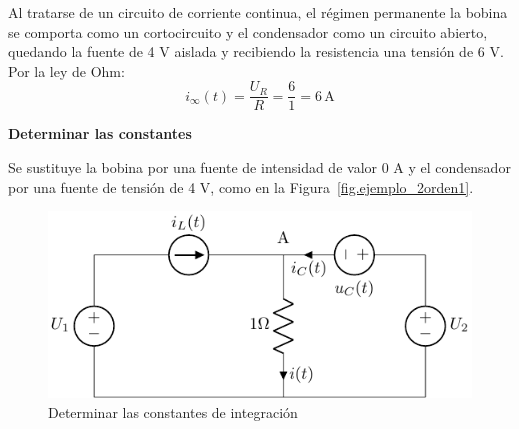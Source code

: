 \begin{example}
  Al tratarse de un circuito de corriente continua, el régimen
  permanente la bobina se comporta como un cortocircuito y el
  condensador como un circuito abierto, quedando la fuente de 4 V
  aislada y recibiendo la resistencia una tensión de 6 V. Por la ley
  de Ohm:
  \begin{equation*}
    i_\infty(t)=\dfrac{U_R}{R}=\dfrac{6}{1}=6\,\text{A}
  \end{equation*}
	    
  \textbf{Determinar las constantes}
	    
  Se sustituye la bobina por una fuente de intensidad de valor 0 A y
  el condensador por una fuente de tensión de 4 V, como en la
  Figura~\ref{fig.ejemplo_2orden1}.
  \begin{figure}[H]
    \centering
    \includegraphics[width=0.45\linewidth]{../figs/ejemplo_2orden2.pdf}
    \caption{Determinar las constantes de integración}
    \label{fig.ejemplo_2orden2}
  \end{figure}
	    

\end{example}
